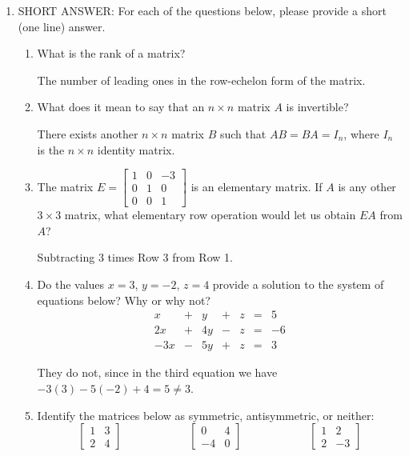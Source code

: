 \documentclass[12pt]{article}
\newcommand{\points}[1]{\marginpar{\hspace{24pt}[#1]}}
\begin{document}
\begin{enumerate}
\item SHORT ANSWER: For each of the questions below, please provide a short (one line) answer.
 \begin{enumerate}
\item What is the rank of a matrix? \points{2}

\bigskip

 The number of leading ones in the row-echelon form of the matrix.

\bigskip

\item What does it mean to say that an $n\times n$ matrix $A$ is invertible? \points{2}


\bigskip

 There exists another $n\times n$ matrix $B$ such that $AB=BA=I_n$, where $I_n$ is the $n\times n$ identity matrix.

\bigskip


\item The matrix $E=\begin{bmatrix}
1&0&-3\\0&1&0\\0&0&1
\end{bmatrix}$ is an elementary matrix. If $A$ is any other $3\times 3$ matrix, what elementary row operation would let us obtain $EA$ from $A$? \points{2}


\bigskip

 Subtracting 3 times Row 3 from Row 1.

\bigskip


\item Do the values $x=3$, $y=-2$, $z=4$ provide a solution to the system of equations below? Why or why not?\points{2}
\[
\begin{array}{ccccccc}
x&+&y&+&z&=&5\\
2x&+&4y&-&z&=&-6\\
-3x&-&5y&+&z&=&3
\end{array}
\]


\bigskip

 They do not, since in the third equation we have $-3(3)-5(-2)+4=5\neq 3$.

\bigskip


\item Identify the matrices below as symmetric, antisymmetric, or neither: \points{2}
\[
\begin{bmatrix}
1&3\\2&4
\end{bmatrix}\hspace{1in} \begin{bmatrix}
0&4\\-4&0
\end{bmatrix}\hspace{1in} \begin{bmatrix}
1&2\\2&-3
\end{bmatrix}
\]


\end{enumerate}
\end{enumerate}
\end{document}
